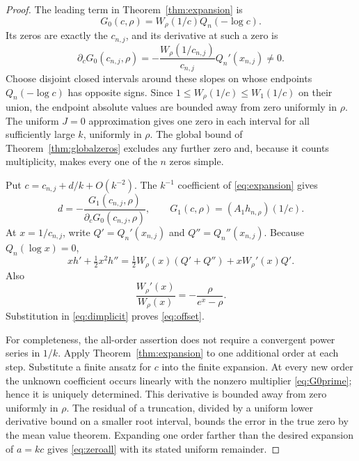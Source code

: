 \documentclass[11pt]{article}
\theoremstyle{definition}
\theoremstyle{remark}
\begin{document}
\begin{proof}
The leading term in Theorem~\ref{thm:expansion} is
\[
 G_0(c,\rho)=W_\rho(1/c)Q_n(-\log c).
\]
Its zeros are exactly the $c_{n,j}$, and its derivative at such a zero is
\begin{equation}\label{eq:G0prime}
 \partial_cG_0(c_{n,j},\rho)
      =-\frac{W_\rho(1/c_{n,j})}{c_{n,j}}Q_n'(x_{n,j})\neq0.
\end{equation}
Choose disjoint closed intervals around these slopes on whose endpoints $Q_n(-\log c)$ has opposite signs. Since $1\leq W_\rho(1/c)\leq W_1(1/c)$ on their union, the endpoint absolute values are bounded away from zero uniformly in $\rho$. The uniform $J=0$ approximation gives one zero in each interval for all sufficiently large $k$, uniformly in $\rho$. The global bound of Theorem~\ref{thm:globalzeros} excludes any further zero and, because it counts multiplicity, makes every one of the $n$ zeros simple.

Put $c=c_{n,j}+d/k+O(k^{-2})$. The $k^{-1}$ coefficient of \eqref{eq:expansion} gives
\begin{equation}\label{eq:dimplicit}
 d=-\frac{G_1(c_{n,j},\rho)}{\partial_cG_0(c_{n,j},\rho)},
 \qquad G_1(c,\rho)=(A_1h_{n,\rho})(1/c).
\end{equation}
At $x=1/c_{n,j}$, write $Q'=Q_n'(x_{n,j})$ and $Q''=Q_n''(x_{n,j})$. Because $Q_n(\log x)=0$,
\[
 xh'+\tfrac12x^2h''
   =\tfrac12W_\rho(x)(Q'+Q'')+xW_\rho'(x)Q'.
\]
Also
\[
 \frac{W_\rho'(x)}{W_\rho(x)}=-\frac{\rho}{e^x-\rho}.
\]
Substitution in \eqref{eq:dimplicit} proves \eqref{eq:offset}.

For completeness, the all-order assertion does not require a convergent power series in $1/k$. Apply Theorem~\ref{thm:expansion} to one additional order at each step. Substitute a finite ansatz for $c$ into the finite expansion. At every new order the unknown coefficient occurs linearly with the nonzero multiplier \eqref{eq:G0prime}; hence it is uniquely determined. This derivative is bounded away from zero uniformly in $\rho$. The residual of a truncation, divided by a uniform lower derivative bound on a smaller root interval, bounds the error in the true zero by the mean value theorem. Expanding one order farther than the desired expansion of $a=kc$ gives \eqref{eq:zeroall} with its stated uniform remainder.
\end{proof}
\end{document}
